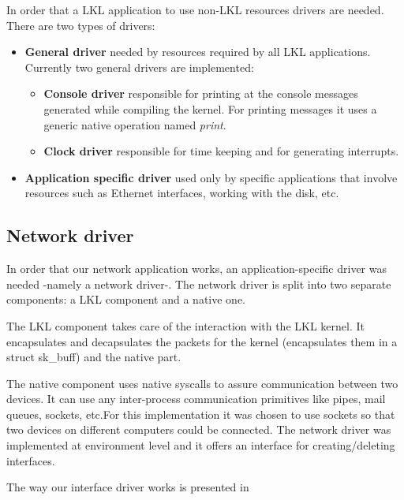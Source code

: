 In order that a LKL application to use non-LKL resources drivers are needed. There are two types of drivers:
\begin{itemize}
\item \textbf{General driver} needed by resources required by all LKL applications. Currently two general drivers are implemented:
\begin{itemize}
\item \textbf{Console driver} responsible for printing at the console messages generated while compiling the kernel. For printing messages it uses a generic native operation named \textit{print}.
\item \textbf{Clock driver} responsible for time keeping and for generating interrupts.
\end{itemize}
\item \textbf{Application specific driver} used only by specific applications that involve resources such as Ethernet interfaces, working with the disk, etc.
\end{itemize}
\subsection{Network driver}
\label{sec:net-driver}
In order that our network application works, an application-specific driver was needed -namely a network driver-. 
The network driver is split into two separate components: a LKL component and a native one.

The LKL component takes care of the interaction with the LKL kernel. It encapsulates
and decapsulates the packets for the kernel (encapsulates them in a struct sk_buff)
and the native part.

The native component uses native syscalls to assure communication between two devices.
It can use any inter-process communication primitives like pipes, mail queues, sockets, etc.For this implementation it was chosen to use sockets so that two devices on different computers could be connected.
The network driver was implemented at environment level and it offers an interface for creating/deleting interfaces.

The way our interface driver works is presented in 


